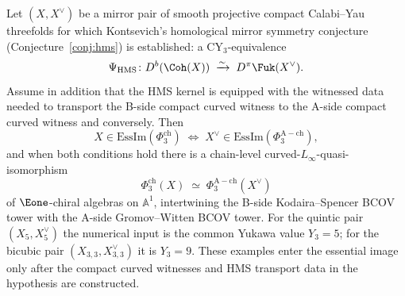 \begin{proposition}
\label{thm:mirror-duality-essential-image}
Let $(X, X^\vee)$ be a mirror pair of smooth projective compact Calabi--Yau threefolds for which Kontsevich's homological mirror symmetry conjecture (Conjecture~\ref{conj:hms}) is established: a CY$_3$-equivalence
\[
 \Psi_{\mathrm{HMS}} \colon D^b(\Coh(X)) \;\xrightarrow{\sim}\; D^\pi\Fuk(X^\vee).
\]
Assume in addition that the HMS kernel is equipped with the witnessed
data needed to transport the B-side compact curved witness to the
A-side compact curved witness and conversely. Then
\[
 X \in \mathrm{EssIm}(\Phi_3^{\mathrm{ch}})
 \;\Longleftrightarrow\;
 X^\vee \in \mathrm{EssIm}(\Phi_3^{\mathrm{A-ch}}),
\]
and when both conditions hold there is a chain-level curved-$L_\infty$-quasi-isomorphism
\[
 \Phi_3^{\mathrm{ch}}(X) \;\simeq\; \Phi_3^{\mathrm{A-ch}}(X^\vee)
\]
of $\Eone$-chiral algebras on $\mathbb{A}^1$, intertwining the B-side Kodaira--Spencer BCOV tower with the A-side Gromov--Witten BCOV tower. For the quintic pair $(X_5, X_5^\vee)$ the numerical input is the common Yukawa value $Y_3 = 5$; for the bicubic pair $(X_{3,3}, X_{3,3}^\vee)$ it is $Y_3 = 9$. These examples enter the essential image only after the compact curved witnesses and HMS transport data in the hypothesis are constructed.
\end{proposition}

